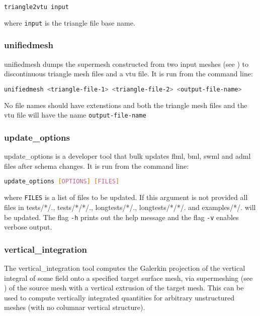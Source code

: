 \begin{lstlisting}[language = Bash]
triangle2vtu input
\end{lstlisting}

where \lstinline+input+ is the triangle file base name.


\subsubsection{unifiedmesh}
\label{sec:unifiedmesh}
unifiedmesh dumps the supermesh constructed from two input meshes (see \citet{farrell2009a,farrell2010a}) to discontinuous triangle mesh files and a vtu file. It is run from the command line:
\begin{lstlisting}[language = Bash]
unifiedmesh <triangle-file-1> <triangle-file-2> <output-file-name>
\end{lstlisting} 
No file names should have extenstions and both the triangle mesh files and the vtu file will have the name \lstinline[language = Bash]+output-file-name+


\subsubsection{update\_options}
\label{sec:update_options}
update\_options is a developer tool that bulk updates flml, bml, swml and adml files after schema changes. It is run from the command line:
\begin{lstlisting}[language = Bash]
update_options [OPTIONS] [FILES]
\end{lstlisting} 
where \lstinline+FILES+ is a list of files to be updated. If this argument is not provided all files in tests/*/., tests/*/*/., longtests/*/., longtests/*/*/. and examples/*/. will be updated.
The flag \lstinline[language = Bash]+-h+ prints out the help message and the flag \lstinline[language = Bash]+-v+ enables verbose output.


\subsubsection{vertical\_integration}
\label{sec:vertical_integration}

The vertical\_integration tool computes the Galerkin projection of the vertical
integral of some field onto a specified target surface mesh, via supermeshing (see \citet{farrell2009a,farrell2010a})
of the source mesh with a vertical extrusion of the target mesh. This can be used to
compute vertically integrated quantities for arbitrary unstructured meshes (with
no columnar vertical structure).

